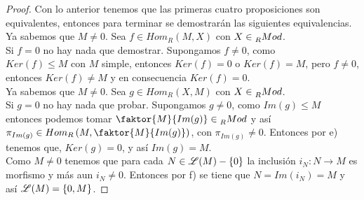 \documentclass{article}
\begin{document}
\begin{enumerate}[label=\textbf{Ej \arabic*.}]
\begin{proof}
			Con lo anterior tenemos que las primeras cuatro proposiciones son equivalentes, entonces para terminar se demostrarán 
			las siguientes equivalencias.\\
			
			 Ya sabemos que $M\neq 0$. Sea $f\in Hom_R(M,X)$ con $X\in \prescript{}{R}{Mod}$.\\
			Si $f=0$ no hay nada que demostrar. Supongamos $f\neq 0$, como \\
			$Ker(f)\leq M$ con $M$ simple, entonces 
			$Ker(f)=0$ o $Ker(f)=M$, pero $f\neq 0$, entonces $Ker(f)\neq M$ y en consecuencia $Ker(f)=0$.\\
			
			 Ya sabemos que $M\neq 0$. Sea $g\in Hom_R(X,M)$ con $X\in \prescript{}{R}{Mod}$.\\
			Si $g=0$ no hay nada que probar. Supongamos $g\neq 0$, como $Im(g)\leq M$ entonces podemos tomar 
			$\faktor{M}{Im(g)} \in \prescript{}{R}{Mod}$ y así \\
			$\pi_{Im(g)}\in Hom_R\left(M,\faktor{M}{Im(g)}\right)$, con $\pi_{Im(g)}\neq 0 $. Entonces por e) tenemos  que, $Ker(g)=0$, y así $Im(g)=M$.\\
			
			 Como $M\neq 0$ tenemos que para cada $ N\in \mathscr{L}(M)-\{0\}$ la inclusión $i_N:N\longrightarrow M$
			es morfismo y más aun $i_N\neq 0$. Entonces por f) se tiene que $N=Im(i_N)=M$ y así $\mathscr{L}(M)=\{0,M\}$. 
		\end{proof}
		

\end{enumerate}
\end{document}
